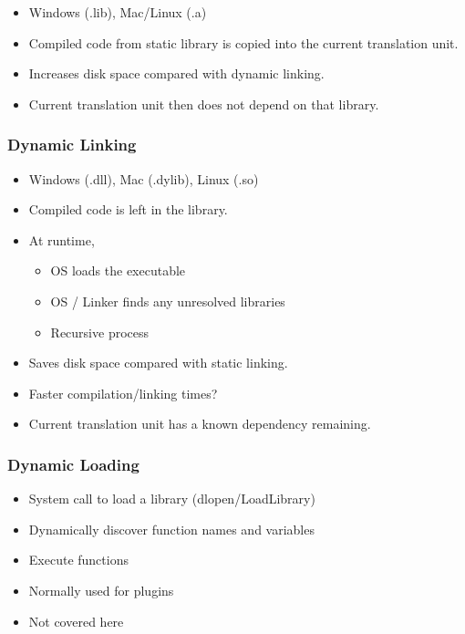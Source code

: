 \begin{itemize}
\itemsep1pt\parskip0pt
\item
  Windows (.lib), Mac/Linux (.a)
\item
  Compiled code from static library is copied into the current
  translation unit.
\item
  Increases disk space compared with dynamic linking.
\item
  Current translation unit then does not depend on that library.
\end{itemize}

\subsubsection{Dynamic Linking}\label{dynamic-linking}

\begin{itemize}
\itemsep1pt\parskip0pt
\item
  Windows (.dll), Mac (.dylib), Linux (.so)
\item
  Compiled code is left in the library.
\item
  At runtime,

  \begin{itemize}
  \itemsep1pt\parskip0pt
  \item
    OS loads the executable
  \item
    OS / Linker finds any unresolved libraries
  \item
    Recursive process
  \end{itemize}
\item
  Saves disk space compared with static linking.
\item
  Faster compilation/linking times?
\item
  Current translation unit has a known dependency remaining.
\end{itemize}

\subsubsection{Dynamic Loading}\label{dynamic-loading}

\begin{itemize}
\itemsep1pt\parskip0pt
\item
  System call to load a library (dlopen/LoadLibrary)
\item
  Dynamically discover function names and variables
\item
  Execute functions
\item
  Normally used for plugins
\item
  Not covered here
\end{itemize}

